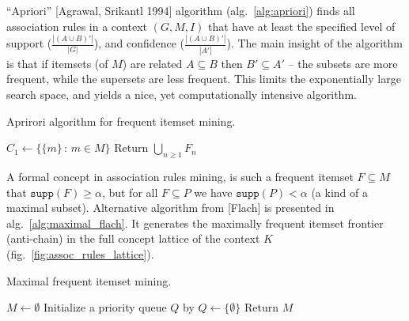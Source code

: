 \documentclass[a4paper,14pt]{extarticle}
\begin{document}
\noindent ``Apriori'' [Agrawal, Srikantl 1994] algorithm (alg.~\ref{alg:apriori})
finds all association rules in a context $(G, M, I)$ that have at least the specified
level of support ($\frac{|(A\cup B)'|}{|G|}$), and confidence ($\frac{|(A\cup B)'|}{|A'|}$).
The main insight of the algorithm is that if itemsets (of $M$) are related $A\subseteq B$
then $B'\subseteq A'$ -- the subsets are more frequent, while the supersets are less
frequent. This limits the exponentially large search space, and yields a nice, yet
computationally intensive algorithm.
\begin{algorithm}
    \caption{Aprirori algorithm for frequent itemset mining.}\label{alg:apriori}
    \BlankLine
    $C_1 \leftarrow \{\{m\}\,:\, m\in M\}$\;
    Return $\bigcup_{n\geq1} F_n$\;
\end{algorithm}

A formal concept in association rules mining, is such a frequent itemset $F\subseteq M$
that $\mathtt{supp}(F)\geq \alpha$, but for all $F\subseteq P$ we have $\mathtt{supp}(P)
< \alpha$ (a kind of a maximal subset). Alternative algorithm from [Flach] is presented
in alg.~\ref{alg:maximal_flach}. It generates the maximally frequent itemset frontier
(anti-chain) in the full concept lattice of the context $K$ (fig.~\ref{fig:assoc_rules_lattice}).

\begin{algorithm}
    \caption{Maximal frequent itemset mining.}\label{alg:maximal_flach}
    \BlankLine
    $M \leftarrow \emptyset$\;
    Initialize a priority queue $Q$ by $Q\leftarrow \{\emptyset\}$\;
    Return $M$\;
\end{algorithm}
\end{document}
